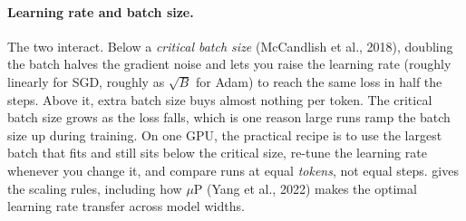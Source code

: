 

\paragraph{Learning rate and batch size.} The two interact. Below a \emph{critical batch size}
(McCandlish et al., 2018), doubling the batch halves the gradient noise and lets you raise the
learning rate (roughly linearly for SGD, roughly as $\sqrt{B}$ for Adam) to reach the same loss in
half the steps. Above it, extra batch size buys almost nothing per token. The critical batch size grows as
the loss falls, which is one reason large runs ramp the batch size up during training. On one GPU,
the practical recipe is to use the largest batch that fits and still sits below the critical size,
re-tune the learning rate whenever you change it, and compare runs at equal \emph{tokens}, not
equal steps.  gives the scaling rules, including how $\mu$P (Yang et al.,
2022) makes the optimal learning rate transfer across model widths.

